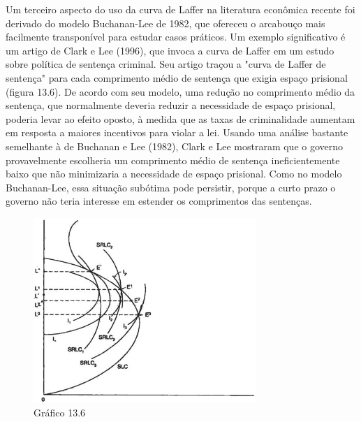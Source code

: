 \documentclass[a4paper,12pt]{article}[abntex2]
\begin{document}
Um terceiro aspecto do uso da curva de Laffer na literatura econômica recente foi derivado do modelo Buchanan-Lee de 1982, que ofereceu o arcabouço mais facilmente transponível para estudar casos práticos. Um exemplo significativo é um artigo de Clark e Lee (1996), que invoca a curva de Laffer em um estudo sobre política de sentença criminal. Seu artigo traçou a "curva de Laffer de sentença" para cada comprimento médio de sentença que exigia espaço prisional (figura 13.6). De acordo com seu modelo, uma redução no comprimento médio da sentença, que normalmente deveria reduzir a necessidade de espaço prisional, poderia levar ao efeito oposto, à medida que as taxas de criminalidade aumentam em resposta a maiores incentivos para violar a lei. Usando uma análise bastante semelhante à de Buchanan e Lee (1982), Clark e Lee mostraram que o governo provavelmente escolheria um comprimento médio de sentença ineficientemente baixo que não minimizaria a necessidade de espaço prisional. Como no modelo Buchanan-Lee, essa situação subótima pode persistir, porque a curto prazo o governo não teria interesse em estender os comprimentos das sentenças.

\begin{figure}[H]
    \centering
    \caption{Gráfico 13.6}
    \includegraphics[width=0.75\textwidth]{4º Período/História do Pensamento Econômico/Tradução HPE/Tradução Tópico 9.3/figura 6.png}
\end{figure}
\end{document}

